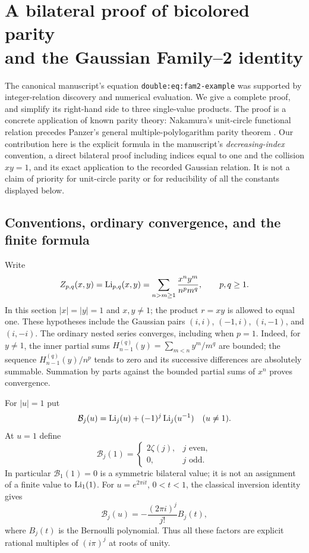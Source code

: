\section[A bilateral proof of bicolored parity and the Gaussian Family--2 identity]{A bilateral proof of bicolored parity\\and the Gaussian Family--2 identity}
\label{bip:sec:main}

The canonical manuscript's equation \texttt{double:eq:fam2-example}
was supported by integer-relation discovery and numerical evaluation.
We give a complete proof, and simplify its right-hand side to three
single-value products.  The proof is a concrete application of known
parity theory: Nakamura's unit-circle functional relation
\cite[Proposition~1.2]{bip:Nakamura2012} precedes Panzer's general
multiple-polylogarithm parity theorem \cite[Theorem~1.3 and (3.2)]{bip:Panzer2017}.
Our contribution here is the explicit formula in the manuscript's
\emph{decreasing-index} convention, a direct bilateral proof including
indices equal to one and the collision $xy=1$, and its exact application
to the recorded Gaussian relation.  It is not a claim of priority for
unit-circle parity or for reducibility of all the constants displayed below.

\subsection{Conventions, ordinary convergence, and the finite formula}
Write
\[
 Z_{p,q}(x,y)=\operatorname{Li}_{p,q}(x,y)
 =\sum_{n>m\ge1}\frac{x^ny^m}{n^pm^q},\qquad p,q\ge1.
\]
In this section $|x|=|y|=1$ and $x,y\ne1$; the product $r=xy$ is
allowed to equal one.  These hypotheses include the Gaussian pairs
$(i,i)$, $(-1,i)$, $(i,-1)$, and $(i,-i)$.
The ordinary nested series converges, including when $p=1$.
Indeed, for $y\ne1$, the inner partial sums
$H_{n-1}^{(q)}(y)=\sum_{m<n}y^m/m^q$ are bounded; the sequence
$H_{n-1}^{(q)}(y)/n^p$ tends to zero and its successive differences
are absolutely summable.  Summation by parts against the bounded
partial sums of $x^n$ proves convergence.

For $|u|=1$ put
\[
 \mathcal B_j(u)=\operatorname{Li}_j(u)+(-1)^j\operatorname{Li}_j(u^{-1})\quad(u\ne1).
\]
At $u=1$ define
\[
 \mathcal B_j(1)=\begin{cases}2\zeta(j),&j\text{ even},\\0,&j\text{ odd}.
 \end{cases}
\]
In particular $\mathcal B_1(1)=0$ is a symmetric bilateral value;
it is not an assignment of a finite value to $\operatorname{Li}_1(1)$.
For $u=e^{2\pi i t}$, $0<t<1$, the classical inversion identity gives
\[
 \mathcal B_j(u)=-\frac{(2\pi i)^j}{j!}B_j(t),
\]
where $B_j(t)$ is the Bernoulli polynomial. Thus all these factors are
explicit rational multiples of $(i\pi)^j$ at roots of unity.


